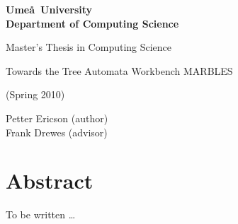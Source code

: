 \thispagestyle{empty}
\vspace*{3cm}

\begin{center}
\sffamily
\bfseries
\large
Ume\aa\ University\\
Department of Computing Science

\vspace{2cm}
Master's Thesis in Computing Science

\vspace{.5cm}

{\huge
Towards the Tree Automata Workbench MARBLES}

\vspace{.5cm}


(Spring 2010)

\bigskip
Petter Ericson (author)\\
Frank Drewes (advisor)
\end{center}

\newpage
\setcounter{page}{0}

\section*{Abstract}

To be written \ldots

\newpage
{}
\setcounter{tocdepth}{1}
\tableofcontents
\newpage
{}
